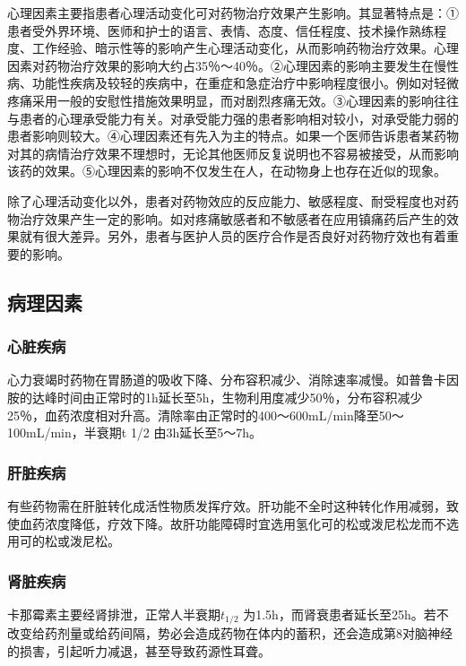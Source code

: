 心理因素主要指患者心理活动变化可对药物治疗效果产生影响。其显著特点是：①患者受外界环境、医师和护士的语言、表情、态度、信任程度、技术操作熟练程度、工作经验、暗示性等的影响产生心理活动变化，从而影响药物治疗效果。心理因素对药物治疗效果的影响大约占35％～40％。②心理因素的影响主要发生在慢性病、功能性疾病及较轻的疾病中，在重症和急症治疗中影响程度很小。例如对轻微疼痛采用一般的安慰性措施效果明显，而对剧烈疼痛无效。③心理因素的影响往往与患者的心理承受能力有关。对承受能力强的患者影响相对较小，对承受能力弱的患者影响则较大。④心理因素还有先入为主的特点。如果一个医师告诉患者某药物对其的病情治疗效果不理想时，无论其他医师反复说明也不容易被接受，从而影响该药的效果。⑤心理因素的影响不仅发生在人，在动物身上也存在近似的现象。

除了心理活动变化以外，患者对药物效应的反应能力、敏感程度、耐受程度也对药物治疗效果产生一定的影响。如对疼痛敏感者和不敏感者在应用镇痛药后产生的效果就有很大差异。另外，患者与医护人员的医疗合作是否良好对药物疗效也有着重要的影响。

\subsection{病理因素}

\subsubsection{心脏疾病}

心力衰竭时药物在胃肠道的吸收下降、分布容积减少、消除速率减慢。如普鲁卡因胺的达峰时间由正常时的1h延长至5h，生物利用度减少50％，分布容积减少25％，血药浓度相对升高。清除率由正常时的400～600mL/min降至50～100mL/min，半衰期{t}
{1/2} 由3h延长至5～7h。

\subsubsection{肝脏疾病}

有些药物需在肝脏转化成活性物质发挥疗效。肝功能不全时这种转化作用减弱，致使血药浓度降低，疗效下降。故肝功能障碍时宜选用氢化可的松或泼尼松龙而不选用可的松或泼尼松。

\subsubsection{肾脏疾病}

卡那霉素主要经肾排泄，正常人半衰期$t_{1/2}$
为1.5h，而肾衰患者延长至25h。若不改变给药剂量或给药间隔，势必会造成药物在体内的蓄积，还会造成第8对脑神经的损害，引起听力减退，甚至导致药源性耳聋。

